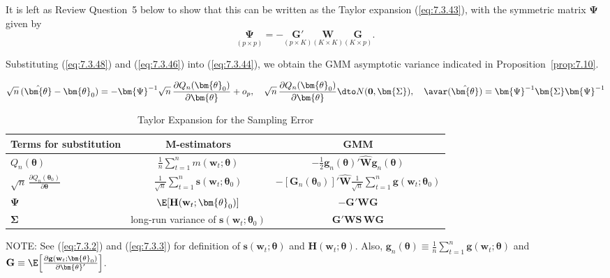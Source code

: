It is left as Review Question~5 below to show that this can be written as the Taylor expansion (\ref{eq:7.3.43}), with the symmetric matrix $\bm{\Psi}$ given by
\begin{equation}
\label{eq:7.3.48}
\underset{(p \times p)}{\bm{\Psi}} = -\underset{(p \times K)}{\mathbf{G}'}\underset{(K \times K)}{\mathbf{W}}\underset{(K \times p)}{\mathbf{G}}.
\end{equation}

Substituting (\ref{eq:7.3.48}) and (\ref{eq:7.3.46}) into (\ref{eq:7.3.44}), we obtain the GMM asymptotic variance indicated in Proposition~\ref{prop:7.10}.

\begin{table}[t]
\centering
\caption{Taylor Expansion for the Sampling Error}
\label{tab:7.1}
\[
\sqrt{n}\,(\hat{\bm{\theta}} - \bm{\theta}_0) = -\bm{\Psi}^{-1}\sqrt{n}\,\frac{\partial Q_n(\bm{\theta}_0)}{\partial\bm{\theta}} + o_p, \quad \sqrt{n}\,\frac{\partial Q_n(\bm{\theta}_0)}{\partial\bm{\theta}} \dto N(\mathbf{0}, \bm{\Sigma}), \quad \avar(\hat{\bm{\theta}}) = \bm{\Psi}^{-1}\bm{\Sigma}\bm{\Psi}^{-1}
\]
\medskip
\begin{tabular}{@{}lcc@{}}
\toprule
Terms for substitution & M-estimators & GMM \\
\midrule
$Q_n(\bm{\theta})$ & $\frac{1}{n}\sum_{t=1}^{n}m(\mathbf{w}_t;\bm{\theta})$ & $-\frac{1}{2}\mathbf{g}_n(\bm{\theta})'\widehat{\mathbf{W}}\mathbf{g}_n(\bm{\theta})$ \\[8pt]
$\sqrt{n}\,\frac{\partial Q_n(\bm{\theta}_0)}{\partial\bm{\theta}}$ & $\frac{1}{\sqrt{n}}\sum_{t=1}^{n}\mathbf{s}(\mathbf{w}_t;\bm{\theta}_0)$ & $-[\mathbf{G}_n(\bm{\theta}_0)]'\widehat{\mathbf{W}}\frac{1}{\sqrt{n}}\sum_{t=1}^{n}\mathbf{g}(\mathbf{w}_t;\bm{\theta}_0)$ \\[8pt]
$\bm{\Psi}$ & $\E[\mathbf{H}(\mathbf{w}_t;\bm{\theta}_0)]$ & $-\mathbf{G}'\mathbf{W}\mathbf{G}$ \\[4pt]
$\bm{\Sigma}$ & long-run variance of $\mathbf{s}(\mathbf{w}_t;\bm{\theta}_0)$ & $\mathbf{G}'\mathbf{W}\mathbf{S}\,\mathbf{W}\mathbf{G}$ \\
\bottomrule
\end{tabular}

\medskip
\footnotesize
NOTE: See (\ref{eq:7.3.2}) and (\ref{eq:7.3.3}) for definition of $\mathbf{s}(\mathbf{w}_t;\bm{\theta})$ and $\mathbf{H}(\mathbf{w}_t;\bm{\theta})$. Also,
$\mathbf{g}_n(\bm{\theta}) \equiv \frac{1}{n}\sum_{t=1}^{n}\mathbf{g}(\mathbf{w}_t;\bm{\theta})$ and $\mathbf{G} \equiv \E\!\left[\frac{\partial\mathbf{g}(\mathbf{w}_t;\bm{\theta}_0)}{\partial\bm{\theta}'}\right]$.
\end{table}

